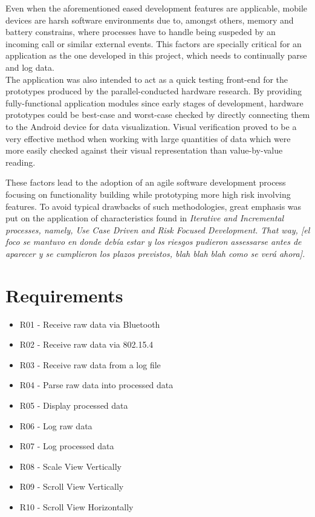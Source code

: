 	Even when the aforementioned eased development features are applicable, mobile devices are harsh software environments due to, amongst others, memory and battery constrains, where processes have to handle being suspeded by an incoming call or similar external events. This factors are specially critical for an application as the one developed in this project, which needs to continually parse and log data.\\

	The application was also intended to act as a quick testing front-end for the prototypes produced by the parallel-conducted hardware research. By providing fully-functional application modules since early stages of development, hardware prototypes could be best-case and worst-case checked by directly connecting them to the Android device for data visualization. Visual verification proved to be a very effective method when working with large quantities of data which were more easily checked against their visual representation than value-by-value reading.

	These factors lead to the adoption of an agile software development process focusing on functionality building while prototyping more high risk involving features. To avoid typical drawbacks of such methodologies, great emphasis was put on the application of characteristics found in \it{Iterative and Incremental processes}, namely, Use Case Driven and Risk Focused Development. That way, [el foco se mantuvo en donde debía estar y los riesgos pudieron assessarse antes de aparecer y se cumplieron los plazos previstos, blah blah blah como se verá ahora].

	\section{Requirements}

		\begin{itemize}
		\item R01 - Receive raw data via Bluetooth
		\item R02 - Receive raw data via 802.15.4
		\item R03 - Receive raw data from a log file
		\item R04 - Parse raw data into processed data
		\item R05 - Display processed data
		\item R06	- Log raw data
		\item R07 - Log processed data	%
		\item R08 - Scale View Vertically
		\item R09 - Scroll View Vertically
		\item R10 - Scroll View Horizontally
		\end{itemize}

